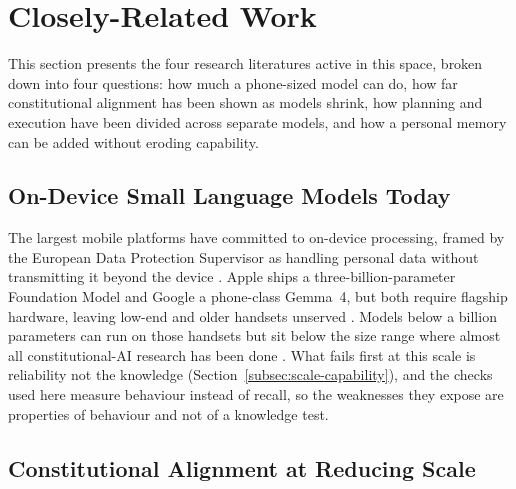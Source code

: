 \section{Closely-Related Work}
\label{sec:closely-related-work}

This section presents the four research literatures active in this space, broken down into four questions: how much a phone-sized model can do, how far constitutional alignment has been shown as models shrink, how planning and execution have been divided across separate models, and how a personal memory can be added without eroding capability. 

\subsection{On-Device Small Language Models Today}
\label{sec:sota-on-device}

The largest mobile platforms have committed to on-device processing, framed by the European Data Protection Supervisor as handling personal data without transmitting it beyond the device \cite{edps2025ondeviceai}. Apple ships a three-billion-parameter Foundation Model and Google a phone-class Gemma~4, but both require flagship hardware, leaving low-end and older handsets unserved \cite{tummalapalli2026llminferenceedgemobile}. Models below a billion parameters can run on those handsets but sit below the size range where almost all constitutional-AI research has been done \cite{yang2025qwen3technicalreport, thawakar2024mobillamaaccuratelightweightfully}. What fails first at this scale is reliability not the knowledge (Section~\ref{subsec:scale-capability}), and the checks used here measure behaviour instead of recall, so the weaknesses they expose are properties of behaviour and not of a knowledge test.

\subsection{Constitutional Alignment at Reducing Scale}
\label{sec:sota-cai-scale}

